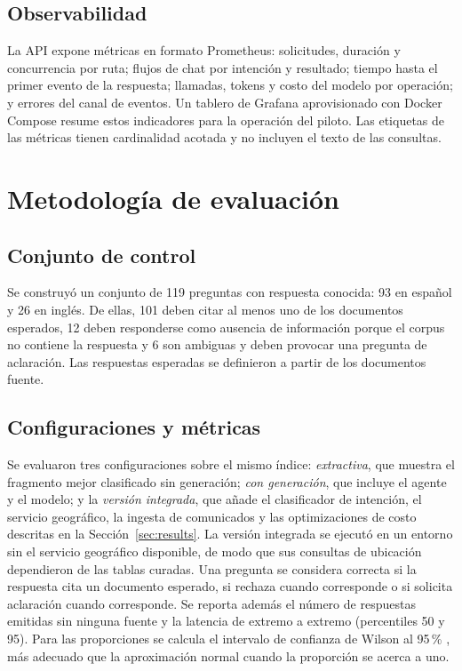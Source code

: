 \documentclass[conference]{IEEEtran}
\begin{document}
\subsection{Observabilidad}
La API expone métricas en formato Prometheus: solicitudes, duración y concurrencia por ruta; flujos de chat por intención y resultado; tiempo hasta el primer evento de la respuesta; llamadas, tokens y costo del modelo por operación; y errores del canal de eventos. Un tablero de Grafana aprovisionado con Docker Compose resume estos indicadores para la operación del piloto. Las etiquetas de las métricas tienen cardinalidad acotada y no incluyen el texto de las consultas.

\section{Metodología de evaluación}
\label{sec:method}

\subsection{Conjunto de control}
Se construyó un conjunto de 119 preguntas con respuesta conocida: 93 en español y 26 en inglés. De ellas, 101 deben citar al menos uno de los documentos esperados, 12 deben responderse como ausencia de información porque el corpus no contiene la respuesta y 6 son ambiguas y deben provocar una pregunta de aclaración. Las respuestas esperadas se definieron a partir de los documentos fuente.

\subsection{Configuraciones y métricas}
Se evaluaron tres configuraciones sobre el mismo índice: \textit{extractiva}, que muestra el fragmento mejor clasificado sin generación; \textit{con generación}, que incluye el agente y el modelo; y la \textit{versión integrada}, que añade el clasificador de intención, el servicio geográfico, la ingesta de comunicados y las optimizaciones de costo descritas en la Sección~\ref{sec:results}. La versión integrada se ejecutó en un entorno sin el servicio geográfico disponible, de modo que sus consultas de ubicación dependieron de las tablas curadas. Una pregunta se considera correcta si la respuesta cita un documento esperado, si rechaza cuando corresponde o si solicita aclaración cuando corresponde. Se reporta además el número de respuestas emitidas sin ninguna fuente y la latencia de extremo a extremo (percentiles 50 y 95). Para las proporciones se calcula el intervalo de confianza de Wilson al 95\,\% \cite{wilson1927}, más adecuado que la aproximación normal cuando la proporción se acerca a uno.
\end{document}
